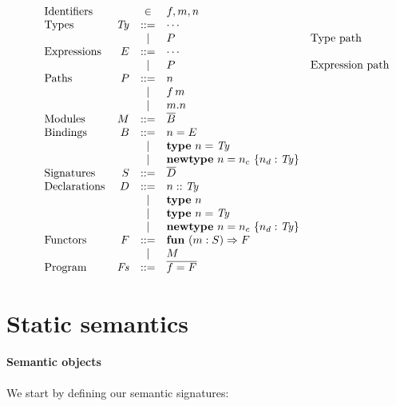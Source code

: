 \documentclass{article}
\begin{document}
\begin{figure}[H]
\[
\begin{array}{lrcll}
\mbox{Identifiers} &  & \in & f, m, n \\
\mbox{Types} & \mathit{Ty} &::=& \cdots \\
             &        & | & P & \mbox{Type path} \\
\mbox{Expressions} & E &::=& \cdots \\
                   &   & | & P & \mbox{Expression path} \\
\mbox{Paths} & P &::=& n \\
             &   & | & f\, m \\
             &   & | & m.n \\
\mbox{Modules} & M &::=& \overline{B} \\
\mbox{Bindings} & B &::=& n=E \\
                &   & | & \mathbf{type}~n=\mathit{Ty} \\
                &   & | & \mathbf{newtype}~n=n_c~\{ n_d : \mathit{Ty} \} \\
\mbox{Signatures} & S &::=& \overline{D} \\
\mbox{Declarations} & D &::=& n :: \mathit{Ty} \\
                    &   & | & \mathbf{type}~n \\
                    &   & | & \mathbf{type}~n=\mathit{Ty} \\
                    &   & | & \mathbf{newtype}~n=n_c~\{ n_d : \mathit{Ty} \} \\
\mbox{Functors} & F &::=& \mathbf{fun}~(m : S) \Rightarrow F \\
                &   & | & M \\
\mbox{Program} & \mathit{Fs} &::=& \overline{f = F} \\
\end{array}
\]
\end{figure}

\section{Static semantics}


\paragraph{Semantic objects} We start by defining our semantic signatures:
\end{document}
